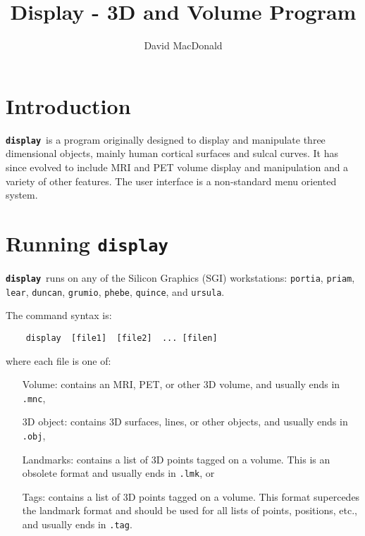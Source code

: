 
\title{Display - 3D and Volume Program}
\author{David MacDonald}

\newcommand{\display}{{\bf\tt display}\ }
\newcommand{\menu}[1]{\fbox{\sc\bf #1}}
\newcommand{\menutwo}[2]{\fbox{\sc\bf #1}/\fbox{\sc\bf #2}}
\newcommand{\menuthree}[3]{\fbox{\sc\bf #1}/\fbox{\sc\bf #2}/\fbox{\sc\bf #3}}




\maketitle

\newpage

\tableofcontents

\newpage

\section{Introduction}

\display is a program originally designed to display and manipulate
three dimensional objects,
mainly human cortical surfaces and sulcal curves.  It has since evolved to
include MRI and PET volume display and manipulation and a variety of other
features.  The user interface is a non-standard menu oriented system.

\section{Running \display}

\display runs on any of the Silicon Graphics (SGI) workstations:
{\tt portia}, {\tt priam}, {\tt lear}, {\tt duncan}, {\tt grumio},
{\tt phebe}, {\tt quince}, and {\tt ursula}.

The command syntax is:

\begin{verbatim}
    display  [file1]  [file2]  ... [filen]
\end{verbatim}

where each file is one of:

\begin{itemize}

\item[Volume:]  contains an MRI, PET, or other 3D volume, and usually ends
                    in {\tt .mnc},

\item[3D object:]  contains 3D surfaces, lines, or other objects, and usually
                    ends in {\tt .obj},

\item[Landmarks:]  contains a list of 3D points tagged on a volume.  This is
                  an obsolete format and usually ends in {\tt .lmk}, or

\item[Tags:]  contains a list of 3D points tagged on a volume.  This format
             supercedes the landmark format and should be used for all
             lists of points, positions, etc., and usually ends in {\tt .tag}.
\end{itemize}

